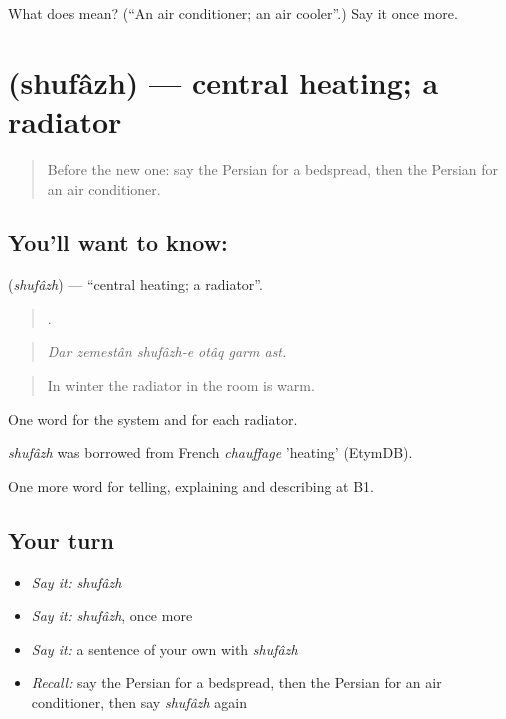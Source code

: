 \begin{tcolorbox}[breakable,colback=teal!4,colframe=teal!35!black,title={Before you move on}]
What does  mean? (\textquotedblleft{}An air conditioner; an air cooler\textquotedblright{}.) Say it once more.
\end{tcolorbox}
\section[\texorpdfstring{\fa{شوفاژ} (shufâzh)}{شوفاژ (shufâzh)}]{ (shufâzh) — central heating; a radiator}

\label{lesson:FA-C439-shufazh}



\begin{quote}
Before the new one: say the Persian for a bedspread, then the Persian for an air conditioner.
\end{quote}

\subsection*{You'll want to know: }
\textbf{} (\emph{shufâzh}) — \textquotedblleft{}central heating; a radiator\textquotedblright{}.

\begin{quote}
     .
\end{quote}

\begin{quote}
\emph{Dar zemestân shufâzh-e otâq garm ast.}
\end{quote}

\begin{quote}
In winter the radiator in the room is warm.
\end{quote}

One word for the system and for each radiator.

\begin{cousinweb}
\emph{shufâzh} was borrowed from French \emph{chauffage} 'heating' (EtymDB).
\end{cousinweb}

\begin{grammarlens}[title={What you've built}]
One more word for telling, explaining and describing at B1.
\end{grammarlens}

\subsection*{Your turn}
\begin{itemize}
\raggedright
  \item \emph{Say it:} \emph{shufâzh}
  \item \emph{Say it:} \emph{shufâzh}, once more
  \item \emph{Say it:} a sentence of your own with \emph{shufâzh}
  \item \emph{Recall:} say the Persian for a bedspread, then the Persian for an air conditioner, then say \emph{shufâzh} again
\end{itemize}

